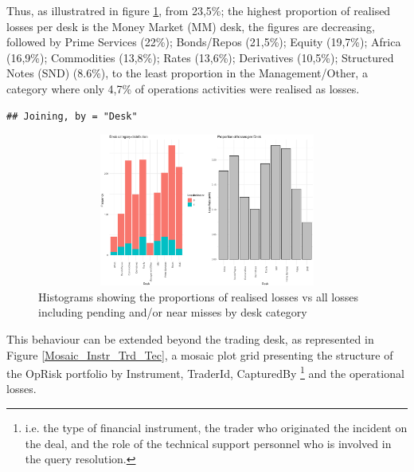 \documentclass[]{article}
\let\rmarkdownfootnote\footnote%
\def\footnote{\protect\rmarkdownfootnote}
\begin{document}
Thus, as illustratred in figure \ref{Desk_Proportions}, from 23,5\%; the
highest proportion of realised losses per desk is the Money Market (MM)
desk, the figures are decreasing, followed by Prime Services (22\%);
Bonds/Repos (21,5\%); Equity (19,7\%); Africa (16,9\%); Commodities
(13,8\%); Rates (13,6\%); Derivatives (10,5\%); Structured Notes (SND)
(8.6\%), to the least proportion in the Management/Other, a category
where only 4,7\% of operations activities were realised as losses.

\singlespacing

\begin{verbatim}
## Joining, by = "Desk"
\end{verbatim}

\doublespacing

\begin{figure}
\centering
\includegraphics[width=20cm,height=5cm]{Exploratory_Desk_Proportions.eps}
\caption[Desk category by realised losses]{Histograms showing the proportions of realised losses vs all losses including pending and/or near misses by desk category}
\label{Desk_Proportions}
\end{figure}

This behaviour can be extended beyond the trading desk, as represented
in Figure \ref{Mosaic_Instr_Trd_Tec}, a mosaic plot grid presenting the
structure of the OpRisk portfolio by Instrument, TraderId, CapturedBy
\footnote{i.e. the type of financial instrument, the trader who originated the incident on the deal, and the role of the technical support personnel who is involved in the query resolution.}
and the operational losses.

\singlespacing

\doublespacing
\end{document}
